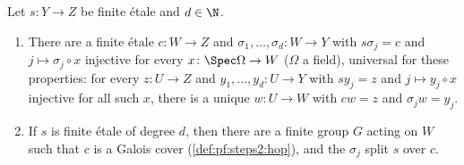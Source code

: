 \begin{lemma}\label{lem:pf:steps2:galclos}
Let $s\colon Y\to Z$ be finite \'etale and $d\in\N$.
\begin{enumerate}[label=\textup{(\alph*)},nosep]
\item There are a finite \'etale $c\colon W\to Z$ and $\sigma_1,\dots,\sigma_d\colon W\to Y$ with
  $s\sigma_j=c$ and $j\mapsto\sigma_j\circ x$ injective for every $x\colon\Spec\Omega\to W$
  \textup{(}$\Omega$ a field\textup{)}, universal for these properties: for every $z\colon U\to Z$ and
  $y_1,\dots,y_d\colon U\to Y$ with $sy_j=z$ and $j\mapsto y_j\circ x$ injective for all such $x$, there
  is a unique $w\colon U\to W$ with $cw=z$ and $\sigma_jw=y_j$.
\item If $s$ is finite \'etale of degree $d$, then there are a finite group $G$ acting on $W$ such that
  $c$ is a Galois cover \textup{(}\cref{def:pf:steps2:hop}\textup{)}, and the $\sigma_j$ split $s$ over
  $c$.
\end{enumerate}
\end{lemma}

